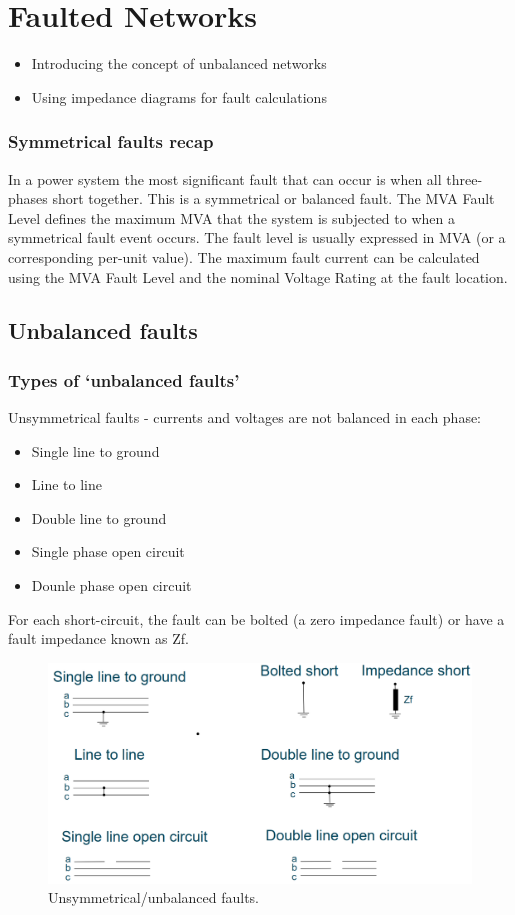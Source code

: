 \documentclass[class=report, crop=false, 12pt,a4paper]{standalone}
\begin{document}
\chapter{Faulted Networks}
\begin{itemize}
	\item Introducing the concept of unbalanced networks
	\item Using impedance diagrams for fault calculations
\end{itemize}
\subsection{Symmetrical faults recap}
In a power system the most significant fault that can occur is when all three-phases short together. This is a symmetrical or balanced fault. The MVA Fault Level defines the maximum MVA that the system is subjected to when a symmetrical fault event occurs. The fault level is usually expressed in MVA (or a corresponding per-unit value). The maximum fault current can be calculated using the MVA Fault Level and the nominal Voltage Rating at the fault location.
\section{Unbalanced faults}
\subsection{Types of `unbalanced faults'}
Unsymmetrical faults - currents and voltages are not balanced in each phase:
\begin{itemize}
	\item Single line to ground
	\item Line to line
	\item Double line to ground
	\item Single phase open circuit
	\item Dounle phase open circuit
\end{itemize}
For each short-circuit, the fault can be bolted (a zero impedance fault) or have a fault impedance known as Zf.
\begin{figure}[H]
	\centering
	\includegraphics[width = \textwidth]{../img/figure20.png}
	\caption{Unsymmetrical/unbalanced faults.}
\end{figure}
\end{document}
